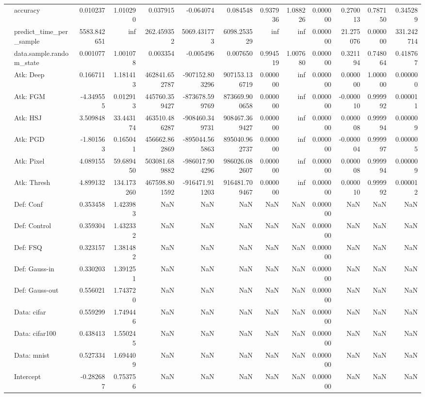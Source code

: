 \begin{table}[htbp]
\begin{tabular}{llrrrrrrrrrrr}
 & accuracy & 0.010237 & 1.010290 & 0.037915 & -0.064074 & 0.084548 & 0.937936 & 1.088226 & 0.000000 & 0.270013 & 0.787150 & 0.345289 \\
 & predict\_time\_per\_sample & 5583.842651 & inf & 262.459352 & 5069.431773 & 6098.253529 & inf & inf & 0.000000 & 21.275076 & 0.000000 & 331.242714 \\
 & data.sample.random\_state & 0.001077 & 1.001078 & 0.003354 & -0.005496 & 0.007650 & 0.994519 & 1.007680 & 0.000000 & 0.321194 & 0.748064 & 0.418767 \\
 & Atk: Deep & 0.166711 & 1.181413 & 462841.652787 & -907152.803296 & 907153.136719 & 0.000000 & inf & 0.000000 & 0.000000 & 1.000000 & 0.000000 \\
 & Atk: FGM & -4.349555 & 0.012913 & 445760.359427 & -873678.599769 & 873669.900658 & 0.000000 & inf & 0.000000 & -0.000010 & 0.999992 & 0.000011 \\
 & Atk: HSJ & 3.509848 & 33.443174 & 463510.486287 & -908460.349731 & 908467.369427 & 0.000000 & inf & 0.000000 & 0.000008 & 0.999994 & 0.000009 \\
 & Atk: PGD & -1.801563 & 0.165041 & 456662.862869 & -895044.565863 & 895040.962737 & 0.000000 & inf & 0.000000 & -0.000004 & 0.999997 & 0.000005 \\
 & Atk: Pixel & 4.089155 & 59.689450 & 503081.689882 & -986017.904296 & 986026.082607 & 0.000000 & inf & 0.000000 & 0.000008 & 0.999994 & 0.000009 \\
 & Atk: Thresh & 4.899132 & 134.173260 & 467598.801592 & -916471.911203 & 916481.709467 & 0.000000 & inf & 0.000000 & 0.000010 & 0.999992 & 0.000012 \\
 & Def: Conf & 0.353458 & 1.423983 & NaN & NaN & NaN & NaN & NaN & 0.000000 & NaN & NaN & NaN \\
 & Def: Control & 0.359304 & 1.432332 & NaN & NaN & NaN & NaN & NaN & 0.000000 & NaN & NaN & NaN \\
 & Def: FSQ & 0.323157 & 1.381482 & NaN & NaN & NaN & NaN & NaN & 0.000000 & NaN & NaN & NaN \\
 & Def: Gauss-in & 0.330203 & 1.391251 & NaN & NaN & NaN & NaN & NaN & 0.000000 & NaN & NaN & NaN \\
 & Def: Gauss-out & 0.556021 & 1.743720 & NaN & NaN & NaN & NaN & NaN & 0.000000 & NaN & NaN & NaN \\
 & Data: cifar & 0.559299 & 1.749446 & NaN & NaN & NaN & NaN & NaN & 0.000000 & NaN & NaN & NaN \\
 & Data: cifar100 & 0.438413 & 1.550245 & NaN & NaN & NaN & NaN & NaN & 0.000000 & NaN & NaN & NaN \\
 & Data: mnist & 0.527334 & 1.694409 & NaN & NaN & NaN & NaN & NaN & 0.000000 & NaN & NaN & NaN \\
 & Intercept & -0.282687 & 0.753756 & NaN & NaN & NaN & NaN & NaN & 0.000000 & NaN & NaN & NaN \\
\cline{1-13}
\bottomrule
\end{tabular}
\end{table}
